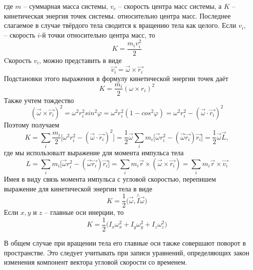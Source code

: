 \documentclass[12pt,a5paper,fleqn]{article}
\begin{document}
где $m$ -- суммарная масса системы, $v_c$ -- скорость центра масс системы, а $K$ -- кинетическая энергия точек системы. относительно центра масс. Последнее слагаемое в случае твёрдого тела сводится к вращению тела как целого. Если $v_i$, -- скорость $i$-й точки относительно центра масс, то
\[K = \dfrac{m_i v_i^2}{2}\]
	Cкорость $v_i$, можно представить в виде
\[\vec{v_i} = \vec{\omega} \times \vec{r_i}\]
	\hspace{0.5cm}Подстановки этого выражения в формулу кинетической энергии точек даёт
\[K = \dfrac{m_i}{2}(\omega \times r_i)^2\]
	Также учтем тождество 
\[(\vec{\omega} \times \vec{r_i})^2 = \omega^2 r_i^2 sin^2 \varphi = \omega^2 r_i^2 (1-cos^2\varphi) = \omega^2 r_i^2 - (\vec{\omega}\cdot\vec{r_i})^2\]
	Поэтому получаем 
\[K = \sum_i \dfrac{m_i}{2}\Big[\omega^2 r_i^2 - (\vec{\omega}\cdot\vec{r_i})^2\Big] =  \dfrac{1}{2}\vec{\omega} \sum_i m_i\Big[\vec{\omega}r_i^2 -(\vec{\omega} \vec{r_i})\vec{r_i} \Big] = \dfrac{1}{2}\vec{\omega}\vec{L},\]
где мы использовалт выражение для момента импульса тела 
\[L=\sum_i m_i\Big[\vec{\omega} r_i^2 - (\vec{\omega}\vec{r_i})\vec{r_i} \Big] = \sum_i m_i\vec{ r} \times (\vec{\omega}\times \vec{r_i}) = \sum_i m_i \vec{r} \times \vec{v_i} \]
	\hspace{0.5cm}Имея в виду связь момента импульса с угловой скоростью, перепишем выражение для кинетической энергии тела в виде
\[K=\dfrac{1}{2}\Big(\vec{\omega},\stackrel{\land}{I}\vec{\omega}\Big)\]
Если $x,y$ и $z$ -- главные оси инерции, то 
\[K =\dfrac{1}{2}\Big(I_x\omega_x^2+I_y\omega_y^2+I_z\omega_z^2\Big)\]

\newpage

В общем случае при вращении тела его главные оси также совершают поворот в пространстве. Это следует учитывать при записи уравнений, определяющих закон изменения компонент вектора угловой скорости со временем.
\end{document}
